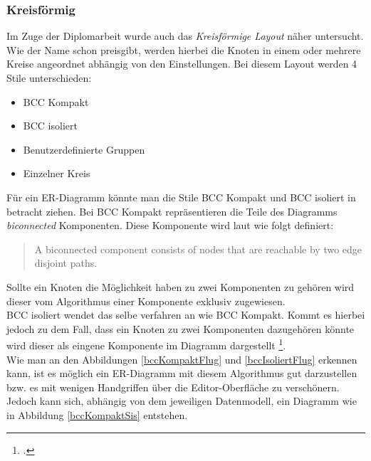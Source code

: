 \subsubsection{Kreisförmig}
\prc

Im Zuge der Diplomarbeit wurde auch das \textit{Kreisförmige Layout} näher untersucht. Wie der Name schon preisgibt, werden hierbei die Knoten in einem oder mehrere Kreise angeordnet abhängig von den Einstellungen. Bei diesem Layout werden 4 Stile unterschieden:
\\

\begin{itemize}
	\item BCC Kompakt
	\item BCC isoliert
	\item Benutzerdefinierte Gruppen
	\item Einzelner Kreis
\end{itemize}

\noindent
\prc
Für ein ER-Diagramm könnte man die Stile BCC Kompakt und BCC isoliert in betracht ziehen. Bei BCC Kompakt repräsentieren die Teile des Diagramms \textit{biconnected} Komponenten. Diese Komponente wird laut  wie folgt definiert:

\begin{quote}
	A biconnected component consists of nodes that are reachable by two edge disjoint paths.
\end{quote}

\noindent
Sollte ein Knoten die Möglichkeit haben zu zwei Komponenten zu gehören wird dieser vom Algorithmus einer Komponente exklusiv zugewiesen.
\\

\noindent
BCC isoliert wendet das selbe verfahren an wie BCC Kompakt. Kommt es hierbei jedoch zu dem Fall, dass ein Knoten zu zwei Komponenten dazugehören könnte wird dieser als eingene Komponente im Diagramm dargestellt \footcite{yEdManual}.
\\

\noindent
Wie man an den Abbildungen \ref{bccKompaktFlug} und \ref{bccIsoliertFlug} erkennen kann, ist es möglich ein ER-Diagramm mit diesem Algorithmus gut darzustellen bzw. es mit wenigen Handgriffen über die Editor-Oberfläche zu verschönern. Jedoch kann sich, abhängig von dem jeweiligen Datenmodell, ein Diagramm wie in Abbildung \ref{bccKompaktSis} entstehen.

